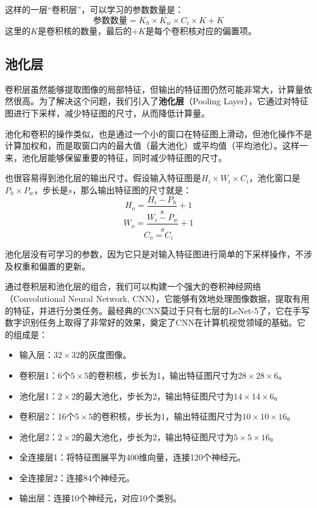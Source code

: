 这样的一层“卷积层”，可以学习的参数数量是：
\[ \text{参数数量} = K_h \times K_w \times C_i \times K + K \]
这里的$K$是卷积核的数量，最后的$+ K$是每个卷积核对应的偏置项。

\subsection{池化层}

卷积层虽然能够提取图像的局部特征，但输出的特征图仍然可能非常大，计算量依然很高。为了解决这个问题，我们引入了\textbf{池化层}（Pooling Layer），它通过对特征图进行下采样，减少特征图的尺寸，从而降低计算量。

池化和卷积的操作类似，也是通过一个小的窗口在特征图上滑动，但池化操作不是计算加权和，而是取窗口内的最大值（最大池化）或平均值（平均池化）。这样一来，池化层能够保留重要的特征，同时减少特征图的尺寸。

也很容易得到池化层的输出尺寸。假设输入特征图是$H_i \times W_i \times C_i$，池化窗口是$P_h \times P_w$，步长是$s$，那么输出特征图的尺寸就是：
\[H_o = \frac{H_i - P_h}{s} + 1\]
\[W_o = \frac{W_i - P_w}{s} + 1\]
\[C_o = C_i\]

池化层没有可学习的参数，因为它只是对输入特征图进行简单的下采样操作，不涉及权重和偏置的更新。

通过卷积层和池化层的组合，我们可以构建一个强大的卷积神经网络（Convolutional Neural Network, CNN），它能够有效地处理图像数据，提取有用的特征，并进行分类任务。最经典的CNN莫过于只有七层的LeNet-5了，它在手写数字识别任务上取得了非常好的效果，奠定了CNN在计算机视觉领域的基础。它的组成是：
\begin{itemize}
    \item 输入层：$32 \times 32$的灰度图像。
    \item 卷积层1：6个$5 \times 5$的卷积核，步长为1，输出特征图尺寸为$28 \times 28 \times 6$。
    \item 池化层1：$2 \times 2$的最大池化，步长为2，输出特征图尺寸为$14 \times 14 \times 6$。
    \item 卷积层2：16个$5 \times 5$的卷积核，步长为1，输出特征图尺寸为$10 \times 10 \times 16$。
    \item 池化层2：$2 \times 2$的最大池化，步长为2，输出特征图尺寸为$5 \times 5 \times 16$。
    \item 全连接层1：将特征图展平为400维向量，连接120个神经元。
    \item 全连接层2：连接84个神经元。
    \item 输出层：连接10个神经元，对应10个类别。
\end{itemize}


